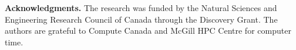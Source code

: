 \documentclass[aps,prb,twocolumn,amsmath,amssymb,superscriptaddress,longbibliography]{revtex4-1}
\begin{document}
\textbf{Acknowledgments.} The research was funded by the Natural Sciences and Engineering Research Council of Canada through the Discovery Grant. The authors are grateful to Compute Canada and McGill HPC Centre for computer time.


%
%
\end{document}

